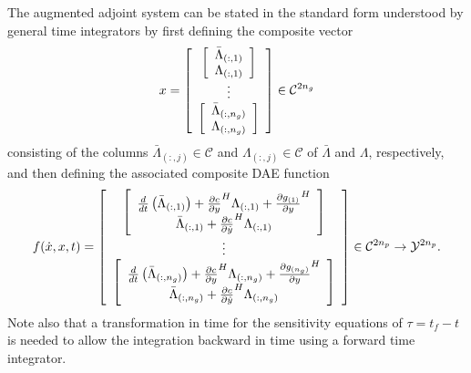 \documentclass[pdf,ps2pdf,11pt]{SANDreport}
\begin{document}
The augmented adjoint system can be stated in the standard form understood by
general time integrators by first defining the composite vector
%
\begin{equation}
x =
{\bmat{c}
{\bmat{c} \bar{\Lambda}_{(:,1)} \\ \Lambda_{(:,1)} \emat} \\
\vdots \\
{\bmat{c} \bar{\Lambda}_{(:,n_g)} \\ \Lambda_{(:,n_g)} \emat} \\
\emat}
\in \mathcal{C}^{2 n_g}
\end{equation}
%
consisting of the columns $\bar{\Lambda}_{(:,j)}\in\mathcal{C}$ and
$\Lambda_{(:,j)}\in\mathcal{C}$ of $\bar{\Lambda}$ and $\Lambda$,
respectively, and then defining the associated composite DAE function
%
\begin{equation}
f(\dot{x},x,t) =
{\bmat{c}
%
{\bmat{c}
\frac{d}{dt}\left( \bar{\Lambda}_{(:,1)} \right)
+ \frac{\partial c}{\partial y}^H \Lambda_{(:,1)} + \frac{\partial g_{(1)}}{\partial y}^H
\\
\bar{\Lambda}_{(:,1)} + \frac{\partial c}{\partial \dot{y}}^H \Lambda_{(:,1)}
\emat} \\
%
\vdots \\
%
{\bmat{c}
\frac{d}{dt}\left( \bar{\Lambda}_{(:,n_g)} \right)
+ \frac{\partial c}{\partial y}^H \Lambda_{(:,n_g)} + \frac{\partial g_{(n_g)}}{\partial y}^H
\\
\bar{\Lambda}_{(:,n_g)} + \frac{\partial c}{\partial \dot{y}}^H \Lambda_{(:,n_g)}
\emat} \\
%
\emat}
\in \mathcal{C}^{2 n_p} \rightarrow \mathcal{Y}^{2 n_p}.
\label{rythmos:eqn:aug-adj-sens-daes}
\end{equation}
%
Note also that a transformation in time for the sensitivity equations of $\tau
= t_f - t$ is needed to allow the integration backward in time using a forward
time integrator.
\end{document}
